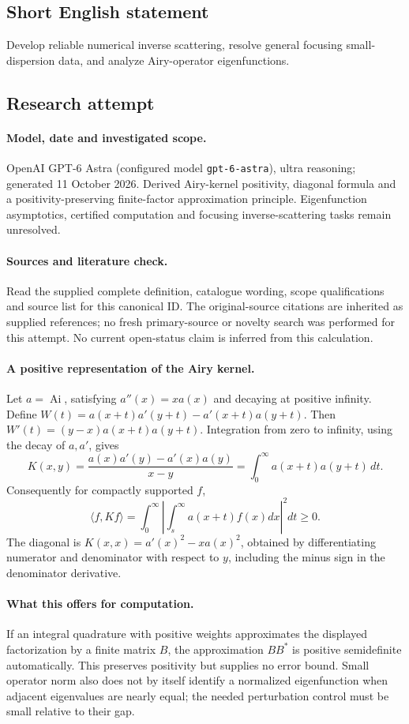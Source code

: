 \documentclass[11pt]{article}
\begin{document}
\subsection{Short English statement}
Develop reliable numerical inverse scattering, resolve general focusing small-dispersion data, and analyze Airy-operator eigenfunctions.
\subsection{Research attempt}
\paragraph{Model, date and investigated scope.}
OpenAI GPT-6 Astra (configured model \texttt{gpt-6-astra}), ultra reasoning; generated 11 October 2026. Derived Airy-kernel positivity, diagonal formula and a positivity-preserving finite-factor approximation principle. Eigenfunction asymptotics, certified computation and focusing inverse-scattering tasks remain unresolved.

\paragraph{Sources and literature check.}
Read the supplied complete definition, catalogue wording, scope qualifications and source list for this canonical ID. The original-source citations are inherited as supplied references; no fresh primary-source or novelty search was performed for this attempt. No current open-status claim is inferred from this calculation.

\paragraph{A positive representation of the Airy kernel.}Let \(a=\operatorname{Ai}\), satisfying \(a''(x)=xa(x)\) and decaying at positive infinity. Define \(W(t)=a(x+t)a'(y+t)-a'(x+t)a(y+t)\). Then \(W'(t)=(y-x)a(x+t)a(y+t)\). Integration from zero to infinity, using the decay of \(a,a'\), gives
\[K(x,y)=\frac{a(x)a'(y)-a'(x)a(y)}{x-y}=\int_0^\infty a(x+t)a(y+t)\,dt.
\]
Consequently for compactly supported \(f\),
\[\langle f,Kf\rangle=\int_0^\infty\left|\int_s^\infty a(x+t)f(x)dx\right|^2dt\ge0.
\]
The diagonal is \(K(x,x)=a'(x)^2-xa(x)^2\), obtained by differentiating numerator and denominator with respect to \(y\), including the minus sign in the denominator derivative.
\paragraph{What this offers for computation.}If an integral quadrature with positive weights approximates the displayed factorization by a finite matrix \(B\), the approximation \(BB^*\) is positive semidefinite automatically. This preserves positivity but supplies no error bound. Small operator norm also does not by itself identify a normalized eigenfunction when adjacent eigenvalues are nearly equal; the needed perturbation control must be small relative to their gap.
\end{document}
